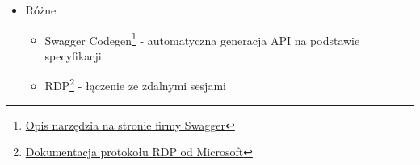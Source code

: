 \documentclass[../opis-rozwiazania.tex]{subfiles}
\begin{document}
\begin{itemize}
\begin{itemize}
              \item libvirt\footnote{\href{https://libvirt.org/}{Strona projektu libvirt}} - zarządzanie maszynami wirtualnymi
              \item OpenLDAP\footnote{\href{https://www.openldap.org/}{Strona projektu OpenLDAP}} - dostępu do systemu katalogowego
              \item NFS\footnote{\href{https://docs.microsoft.com/en-us/windows-server/storage/nfs/nfs-overview}{Opis na stronie firmy Microsoft}} - dostęp do katalogów domowych z maszyny wirtualnej
              \item Arch Linux\footnote{\href{https://archlinux.org/}{Strona systemu operacyjnego Arch Linux}} - system operacyjny uruchamiany przez maszyny wirtualne
              \item GNU/Linux - wspierany system operacyjny
          \end{itemize}
    \item Różne
          \begin{itemize}
              \item Swagger Codegen\footnote{\href{https://swagger.io/tools/swagger-codegen/}{Opis narzędzia na stronie firmy Swagger}} - automatyczna generacja API na podstawie specyfikacji
              \item RDP\footnote{\href{https://docs.microsoft.com/en-us/troubleshoot/windows-server/remote/understanding-remote-desktop-protocol}{Dokumentacja protokołu RDP od Microsoft}} - łączenie ze zdalnymi sesjami
          \end{itemize}
\end{itemize}
\end{document}
